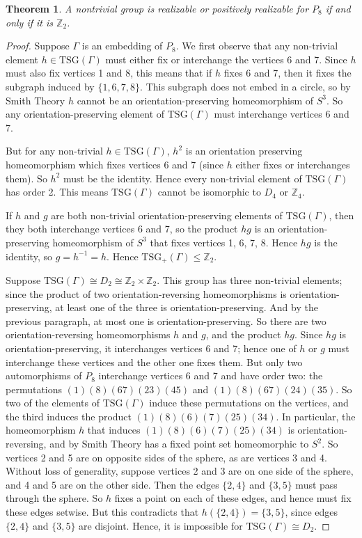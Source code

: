 \documentclass[11]{amsart}
\def\Z{\mathbb{Z}}
\def\TSG{{\mathrm{TSG}}}
\newtheorem{theorem}{Theorem}[section]
\theoremstyle{definition}
\theoremstyle{remark}
\begin{document}
\begin{theorem} \label{T:P8}
A nontrivial group is realizable or positively realizable for $P_8$ if and only if it is $\Z_2$.
\end{theorem}
\begin{proof}
Suppose $\Gamma$ is an embedding of $P_8$. We first observe that any non-trivial element $h \in \TSG(\Gamma)$ must either fix or interchange the vertices 6 and 7.  Since $h$ must also fix vertices 1 and 8, this means that if $h$ fixes 6 and 7, then it fixes the subgraph induced by $\{1, 6, 7, 8\}$.  This subgraph does not embed in a circle, so by Smith Theory $h$ cannot be an orientation-preserving homeomorphism of $S^3$. So any orientation-preserving element of $\TSG(\Gamma)$ must interchange vertices 6 and 7.

But for any non-trivial $h \in \TSG(\Gamma)$, $h^2$ is an orientation preserving homeomorphism which fixes vertices 6 and 7 (since $h$ either fixes or interchanges them).  So $h^2$ must be the identity.  Hence every non-trivial element of $\TSG(\Gamma)$ has order 2. This means $\TSG(\Gamma)$ cannot be isomorphic to $D_4$ or $\Z_4$.

If $h$ and $g$ are both non-trivial orientation-preserving elements of $\TSG(\Gamma)$, then they both interchange vertices 6 and 7, so the product $hg$ is an orientation-preserving homeomorphism of $S^3$ that fixes vertices 1, 6, 7, 8.  Hence $hg$ is the identity, so $g= h^{-1} = h$.  Hence $\TSG_+(\Gamma) \leq \Z_2$.

Suppose $\TSG(\Gamma) \cong D_2 \cong \Z_2 \times \Z_2$.  This group has three non-trivial elements; since the product of two orientation-reversing homeomorphisms is orientation-preserving, at least one of the three is orientation-preserving.  And by the previous paragraph, at most one is orientation-preserving. So there are two orientation-reversing homeomorphisms $h$ and $g$, and the product $hg$. Since $hg$ is orientation-preserving, it interchanges vertices 6 and 7; hence one of $h$ or $g$ must interchange these vertices and the other one fixes them. But only two automorphisms of $P_8$ interchange vertices 6 and 7 and have order two: the permutations $(1)(8)(67)(23)(45)$ and $(1)(8)(67)(24)(35)$.  So two of the elements of $\TSG(\Gamma)$ induce these permutations on the vertices, and the third induces the product $(1)(8)(6)(7)(25)(34)$. In particular, the homeomorphism $h$ that induces $(1)(8)(6)(7)(25)(34)$ is orientation-reversing, and by Smith Theory has a fixed point set homeomorphic to $S^2$.  So vertices 2 and 5 are on opposite sides of the sphere, as are vertices 3 and 4. Without loss of generality, suppose vertices 2 and 3 are on one side of the sphere, and 4 and 5 are on the other side.  Then the edges $\{2,4\}$ and $\{3,5\}$ must pass through the sphere. So $h$ fixes a point on each of these edges, and hence must fix these edges setwise. But this contradicts that $h(\{2,4\}) = \{3,5\}$, since edges $\{2,4\}$ and $\{3,5\}$ are disjoint. Hence, it is impossible for $\TSG(\Gamma) \cong D_2$.


\end{proof}
\end{document}
